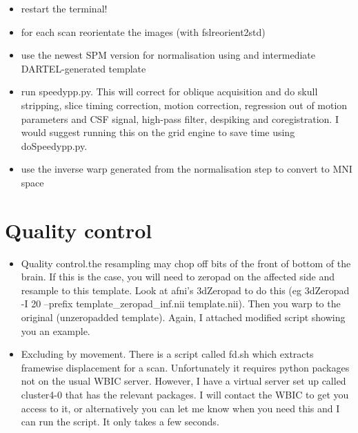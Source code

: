 \documentclass[a4paper,10pt]{article}
\begin{document}
\begin{itemize}
 \item restart the terminal!
 \item for each scan reorientate the images (with fslreorient2std)
 \item use the newest SPM version for normalisation using and intermediate DARTEL-generated template
 \item run speedypp.py. This will correct for oblique acquisition and do skull stripping, slice timing correction, motion correction, regression out of motion parameters and CSF signal, high-pass filter,  despiking and coregistration.
  I would suggest running this on the grid engine to save time using doSpeedypp.py.
 \item use the inverse warp generated from the normalisation step to convert to MNI space
\end{itemize}

\section{Quality control}
\begin{itemize}
 \item Quality control.the resampling may chop off bits of the front of bottom of the brain. If this is the case, you will need to zeropad on the affected side and resample to this template. Look at afni's 3dZeropad to do this (eg 3dZeropad -I 20 --prefix template\_zeropad\_inf.nii template.nii). Then you warp to the original (unzeropadded template). Again, I attached modified script showing you an example.

 \item Excluding by movement. There is a script called fd.sh which extracts framewise displacement for a scan. Unfortunately it requires python packages not on the usual WBIC server. However, I have a virtual server set up called cluster4-0 that has the relevant packages. I will contact the WBIC to get you access to it, or alternatively you can let me know when you need this and I can run the script. It only takes a few seconds.
\end{itemize}
\end{document}
